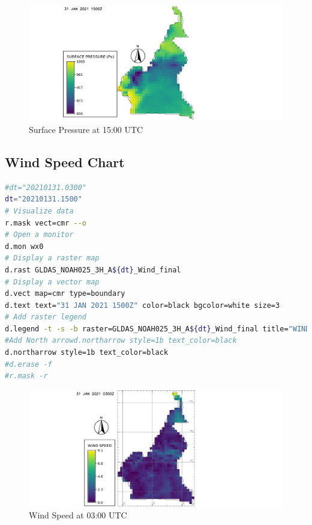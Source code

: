 \begin{figure}[H]
\begin{center}
\includegraphics[scale=0.6]{sp15.png} %
\end{center}
\caption{Surface Pressure  at 15:00 UTC}
\label{Surface Pressure  at 15:00 UTC}%
\end{figure}


\subsection{Wind Speed Chart}
\begin{lstlisting}[language=Bash]
#dt="20210131.0300"
dt="20210131.1500"
# Visualize data
r.mask vect=cmr --o
# Open a monitor
d.mon wx0
# Display a raster map
d.rast GLDAS_NOAH025_3H_A${dt}_Wind_final
# Display a vector map
d.vect map=cmr type=boundary
d.text text="31 JAN 2021 1500Z" color=black bgcolor=white size=3
# Add raster legend
d.legend -t -s -b raster=GLDAS_NOAH025_3H_A${dt}_Wind_final title="WIND SPEED m/s" title_fontsize=20 font=sans fontsize=18
#Add North arrowd.northarrow style=1b text_color=black
d.northarrow style=1b text_color=black
#d.erase -f
#r.mask -r

\end{lstlisting}

\begin{figure}[H]
\begin{center}
\includegraphics[scale=0.6]{ws03.png} %
\end{center}
\caption{Wind Speed at 03:00 UTC}
\label{Surface Pressure  at 03:00 UTC}%
\end{figure}

